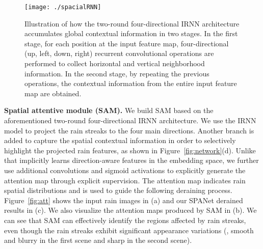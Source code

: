 \documentclass[10pt,twocolumn,letterpaper]{article}
\begin{document}
\begin{figure}[t]
\centering
\texttt{[image: ./spacialRNN]}
\caption{Illustration of how the two-round four-directional IRNN architecture accumulates global contextual information in two stages. In the first stage, for each position at the input feature map, four-directional (up, left, down, right) recurrent convolutional operations are performed to collect horizontal and vertical neighborhood information. In the second stage, by repeating the previous operations, the contextual information from the entire input feature map are obtained.}
\label{fig:GA}
\vspace{-4mm}
\end{figure}

{\bf Spatial attentive module (SAM).} We build SAM based on the aforementioned two-round four-directional IRNN architecture. We use the IRNN model to project the rain streaks to the four main directions. Another branch is added to capture the spatial contextual information in order to selectively highlight the projected rain features, as shown in Figure~\ref{fig:network}(d).
Unlike~\cite{hu:cvpr:2018:dsc} that implicitly learns direction-aware features in the embedding space, we further use additional convolutions and sigmoid activations to explicitly generate the attention map through explicit supervision. The attention map indicates rain spatial distributions and is used to guide the following deraining process. 
Figure~\ref{fig:att} shows the input rain images in (a) and our SPANet derained results in (c). We also visualize the attention maps produced by SAM in (b). We can see that SAM can effectively identify the regions affected by rain streaks, even though the rain streaks exhibit significant appearance variations (\ie, smooth and blurry in the first scene and sharp in the second scene).
\end{document}
